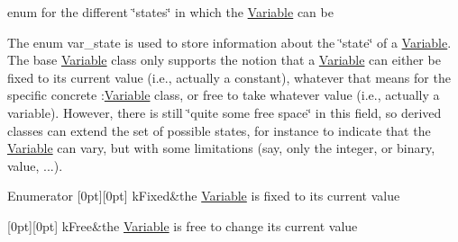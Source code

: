 enum for the different \char`\"{}states\char`\"{} in which the \mbox{\hyperlink{class_s_m_spp__di__unipi__it_1_1_variable}{Variable}} can be 

The enum var\+\_\+state is used to store information about the \char`\"{}state\char`\"{} of a \mbox{\hyperlink{class_s_m_spp__di__unipi__it_1_1_variable}{Variable}}. The base \mbox{\hyperlink{class_s_m_spp__di__unipi__it_1_1_variable}{Variable}} class only supports the notion that a \mbox{\hyperlink{class_s_m_spp__di__unipi__it_1_1_variable}{Variable}} can either be fixed to its current value (i.\+e., actually a constant), whatever that means for the specific concrete \+:\mbox{\hyperlink{class_s_m_spp__di__unipi__it_1_1_variable}{Variable}} class, or free to take whatever value (i.\+e., actually a variable). However, there is still \char`\"{}quite some free space\char`\"{} in this field, so derived classes can extend the set of possible states, for instance to indicate that the \mbox{\hyperlink{class_s_m_spp__di__unipi__it_1_1_variable}{Variable}} can vary, but with some limitations (say, only the integer, or binary, value, ...). \begin{DoxyEnumFields}{Enumerator}
[0pt][0pt]{}\mbox{\label{class_s_m_spp__di__unipi__it_1_1_variable_a30febf04ce89c19659143fa83ae6f7baaf0cb52fcb65ba1ee2e93ef655d5c7693}} 
k\+Fixed&the \mbox{\hyperlink{class_s_m_spp__di__unipi__it_1_1_variable}{Variable}} is fixed to its current value \\
\hline

[0pt][0pt]{}\mbox{\label{class_s_m_spp__di__unipi__it_1_1_variable_a30febf04ce89c19659143fa83ae6f7baa215574cae9a84b3151d2fb68d4c4d9d1}} 
k\+Free&the \mbox{\hyperlink{class_s_m_spp__di__unipi__it_1_1_variable}{Variable}} is free to change its current value \\
\hline

\end{DoxyEnumFields}


